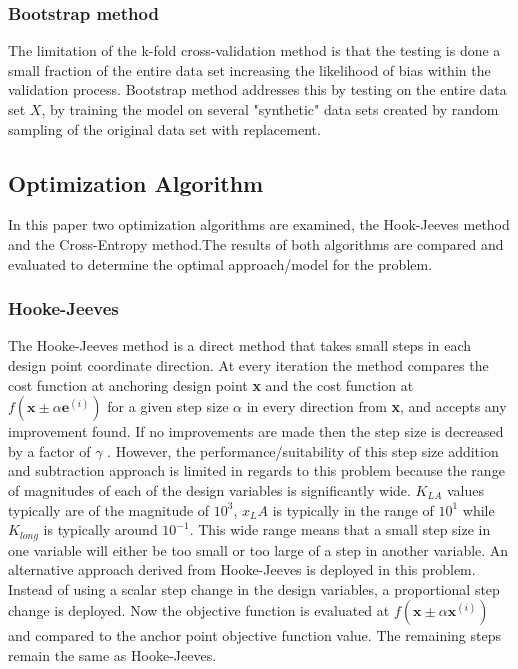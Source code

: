 \documentclass[conf]{new-aiaa}
\begin{document}
\subsubsection{Bootstrap method}
The limitation of the k-fold cross-validation method is that the testing is done a small fraction of the entire data set increasing the likelihood of bias within the validation process. Bootstrap method addresses this by testing on the entire data set $X$, by training the model on several "synthetic" data sets created by random sampling of the original data set with replacement.

\subsection{Optimization Algorithm} %
\label{section:Optimization Algorithm}
In this paper two optimization algorithms are examined, the Hook-Jeeves method and the Cross-Entropy method.The results of both algorithms are compared and evaluated to determine the optimal approach/model for the problem.

\subsubsection{Hooke-Jeeves}
The Hooke-Jeeves method is a direct method that takes small steps in each design point coordinate direction. At every iteration the method compares the cost function at anchoring design point \textbf{x} and the cost function at $f(\textbf{x}\pm\alpha \textbf{e}^{(i)})$ for a given step size $\alpha$ in every direction from \textbf{x}, and accepts any improvement found. If no improvements are made then the step size is decreased by a factor of $\gamma$ \cite{kochenderfer2019algorithms}.
However, the performance/suitability of this step size addition and subtraction approach is limited in regards to this problem because the range of magnitudes of each of the design variables is significantly wide. $K_{LA}$ values typically are of the magnitude of $10^3$, $x_LA$ is typically in the range of $10^1$ while $K_{long}$ is typically around $10^{-1}$. This wide range means that a small step size in one variable will  either be too small or too large of a step in another variable. An alternative approach derived from Hooke-Jeeves is deployed in this problem. Instead of using a scalar step change in the design variables, a proportional step change is deployed. Now the objective function is evaluated at $f(\textbf{x}\pm\alpha \textbf{x}^{(i)})$ and compared to the anchor point objective function value. The remaining steps remain the same as Hooke-Jeeves.
\end{document}
